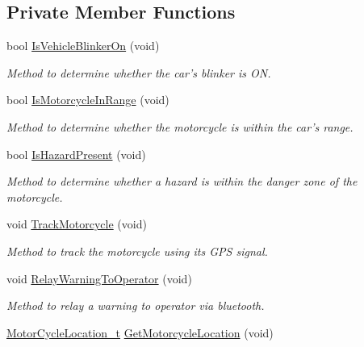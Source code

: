 \subsection*{Private Member Functions}
\begin{DoxyCompactItemize}
\item 
bool \hyperlink{classMotorcycleAwarenessSystem_a9c3f98a014b0af39fa120f478eb5f348}{Is\-Vehicle\-Blinker\-On} (void)
\begin{DoxyCompactList}\small\item\em Method to determine whether the car's blinker is O\-N. \end{DoxyCompactList}\item 
bool \hyperlink{classMotorcycleAwarenessSystem_a239655aca9c875b1dbbad3ce155c7892}{Is\-Motorcycle\-In\-Range} (void)
\begin{DoxyCompactList}\small\item\em Method to determine whether the motorcycle is within the car's range. \end{DoxyCompactList}\item 
bool \hyperlink{classMotorcycleAwarenessSystem_a35d59c8299b0d5ef43c10306cc7f2ee1}{Is\-Hazard\-Present} (void)
\begin{DoxyCompactList}\small\item\em Method to determine whether a hazard is within the danger zone of the motorcycle. \end{DoxyCompactList}\item 
void \hyperlink{classMotorcycleAwarenessSystem_a4e6eec23ec46e24ee377a3c94e15eba4}{Track\-Motorcycle} (void)
\begin{DoxyCompactList}\small\item\em Method to track the motorcycle using its G\-P\-S signal. \end{DoxyCompactList}\item 
void \hyperlink{classMotorcycleAwarenessSystem_aec5e4731c6bf0789821ba2793918e3ee}{Relay\-Warning\-To\-Operator} (void)
\begin{DoxyCompactList}\small\item\em Method to relay a warning to operator via bluetooth. \end{DoxyCompactList}\item 
\hyperlink{structMotorCycleLocation__t}{Motor\-Cycle\-Location\-\_\-t} \hyperlink{classMotorcycleAwarenessSystem_a840a5bc17d75276ecdb3a39d7aaf4109}{Get\-Motorcycle\-Location} (void)
\end{DoxyCompactItemize}
